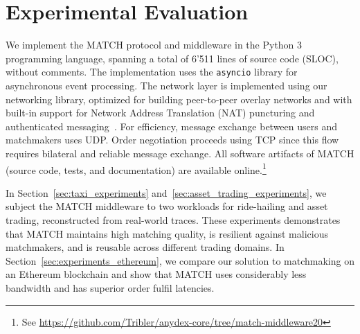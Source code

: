 \section{Experimental Evaluation}
\label{sec:match_experiments}
We implement the MATCH protocol and middleware in the Python 3 programming language, spanning a total of 6'511 lines of source code (SLOC), without comments.
The implementation uses the \texttt{asyncio} library for asynchronous event processing.
The network layer is implemented using our networking library, optimized for building peer-to-peer overlay networks and with built-in support for Network Address Translation (NAT) puncturing and authenticated messaging~\cite{ipv8}.
For efficiency, message exchange between users and matchmakers uses UDP.
Order negotiation proceeds using TCP since this flow requires bilateral and reliable message exchange.
All software artifacts of MATCH (source code, tests, and documentation) are available online.\footnote{See \url{https://github.com/Tribler/anydex-core/tree/match-middleware20}}

In Section~\ref{sec:taxi_experiments} and~\ref{sec:asset_trading_experiments}, we subject the MATCH middleware to two workloads for ride-hailing and asset trading, reconstructed from real-world traces.
These experiments demonstrates that MATCH maintains high matching quality, is resilient against malicious matchmakers, and is reusable across different trading domains.
In Section~\ref{sec:experiments_ethereum}, we compare our solution to matchmaking on an Ethereum blockchain and show that MATCH uses considerably less bandwidth and has superior order fulfil latencies.

